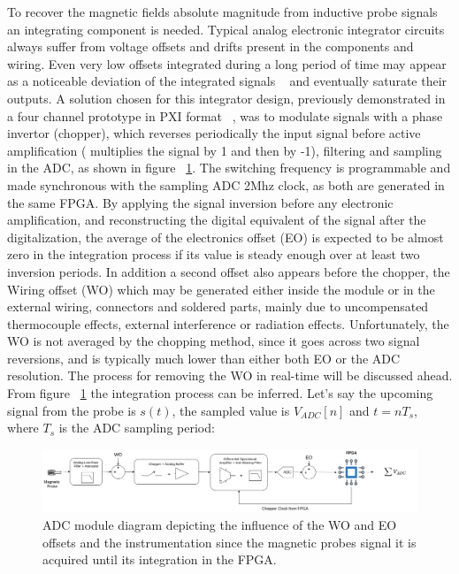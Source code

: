 To recover the magnetic fields absolute magnitude from inductive probe signals an integrating component is needed. Typical analog electronic integrator circuits always suffer from voltage offsets and drifts present in the components and wiring. Even very low offsets integrated during a long period of time may appear as a noticeable deviation of the integrated signals ~\cite{Spuig2003} and eventually saturate their outputs. A solution chosen for this integrator design, previously demonstrated in a four channel prototype in PXI format ~\cite{Werner2008}, was to modulate signals with a phase invertor (chopper), which reverses periodically the input signal before active amplification ( multiplies the signal by 1 and then by -1), filtering and sampling in the ADC, as shown in figure ~\ref{ADC_FPGA}. The switching frequency is programmable and made synchronous with the sampling ADC 2Mhz clock, as both are generated in the same FPGA. By applying the signal inversion before any electronic amplification, and reconstructing the digital equivalent of the signal after the digitalization, the average of the electronics offset (EO) is expected to be almost  zero in the integration process if its value is steady enough over at least two inversion periods. In addition a second offset also appears before the chopper, the Wiring offset (WO) which may be generated either inside the module or in the external wiring, connectors and soldered parts, mainly due to uncompensated thermocouple effects, external interference or radiation effects. Unfortunately, the WO is not averaged by the chopping method, since it goes across two signal reversions, and is typically much lower than either both EO or the ADC resolution. The process for removing the WO in real-time will be discussed ahead. From figure ~\ref{ADC_FPGA} the integration process can be inferred. Let's say the upcoming signal from the probe is $s(t)$, the sampled value is $V_{ADC}[n]$ and $t=nT_s$, where $T_s$ is the ADC sampling period:
\smallskip


\begin{figure}[htbp]
	\centering
	\includegraphics[width=1\textwidth]{Chp4/ADC_FPGA.png}
	\caption{\label{ADC_FPGA} ADC module diagram depicting the influence of the WO and EO offsets and the instrumentation since the magnetic probes signal it is acquired until its integration in the FPGA. }
\end{figure}

